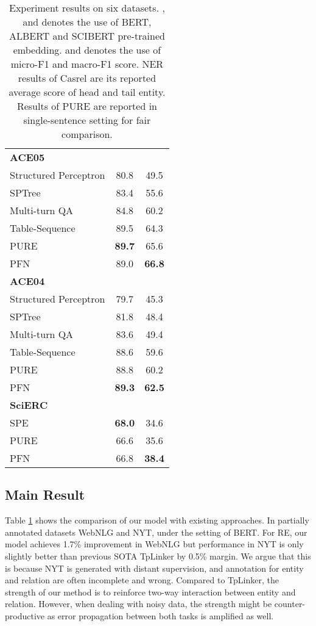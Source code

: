 \documentclass[11pt]{article}
\begin{document}
\begin{table}[!ht]
\begin{spacing}{1.19}
{\begin{tabular}{lcc}
\midrule
\multicolumn{3}{l}{\textbf{ACE05} } \\
Structured Perceptron \citep{li-ji-2014-incremental} & 80.8 & 49.5 \\ 
SPTree \citep{miwa-bansal-2016-end} & 83.4 & 55.6 \\
Multi-turn QA \citep{li-etal-2019-entity}  & 84.8 & 60.2 \\
Table-Sequence \citep{wang-lu-2020-two}  & 89.5 & 64.3 \\
PURE \citep{zhong2021frustratingly}  & \textbf{89.7} & 65.6 \\
\hline
PFN & 89.0 & \textbf{66.8} \\
\midrule
\multicolumn{3}{l}{\textbf{ACE04} } \\
Structured Perceptron \citep{li-ji-2014-incremental} & 79.7 & 45.3 \\ 
SPTree \citep{miwa-bansal-2016-end} & 81.8 & 48.4 \\
Multi-turn QA \citep{li-etal-2019-entity}  & 83.6 & 49.4 \\
Table-Sequence \citep{wang-lu-2020-two}  & 88.6 & 59.6 \\
PURE \citep{zhong2021frustratingly}  & 88.8 & 60.2 \\
\hline
PFN & \textbf{89.3} & \textbf{62.5} \\
\midrule
\multicolumn{3}{l}{\textbf{SciERC} } \\
SPE \citep{wang-etal-2020-pre}  & \textbf{68.0} & 34.6 \\
PURE \citep{zhong2021frustratingly}  & 66.6 & 35.6 \\
\hline
PFN &66.8 &\textbf{38.4} \\
\bottomrule
\end{tabular}
}
\end{spacing}
\caption{Experiment results on six datasets. ,  and  denotes the use of BERT, ALBERT and SCIBERT\citep{devlin2019bert, Lan2020ALBERT:, beltagy-etal-2019-scibert} pre-trained embedding.  and  denotes the use of micro-F1 and macro-F1 score. NER results of Casrel are its reported average score of head and tail entity. Results of PURE are reported in single-sentence setting for fair comparison.}
\label{tab:my-table2}
\end{table}

\subsection{Main Result}
Table \ref{tab:my-table2} shows the comparison of our model with existing approaches. In partially annotated datasets WebNLG and NYT, under the setting of BERT. For RE, our model achieves 1.7\% improvement in WebNLG but performance in NYT is only slightly better than previous SOTA TpLinker \citep{wang-etal-2020-tplinker} by 0.5\% margin. We argue that this is because NYT is generated with distant supervision, and annotation for entity and relation are often incomplete and wrong. Compared to TpLinker, the strength of our method is to reinforce two-way interaction between entity and relation. However, when dealing with noisy data, the strength might be counter-productive as error propagation between both tasks is amplified as well. 
\end{document}
